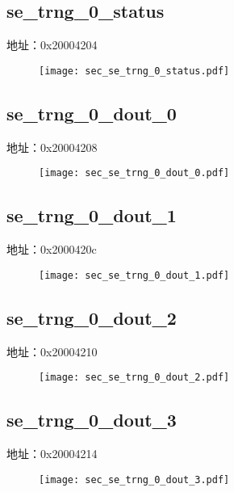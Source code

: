 \subsection{se\_trng\_0\_status}
\label{sec-se-trng-0-status}
地址：0x20004204
 \begin{figure}[H]
\texttt{[image: sec\_se\_trng\_0\_status.pdf]}
\end{figure}

\subsection{se\_trng\_0\_dout\_0}
\label{sec-se-trng-0-dout-0}
地址：0x20004208
 \begin{figure}[H]
\texttt{[image: sec\_se\_trng\_0\_dout\_0.pdf]}
\end{figure}

\subsection{se\_trng\_0\_dout\_1}
\label{sec-se-trng-0-dout-1}
地址：0x2000420c
 \begin{figure}[H]
\texttt{[image: sec\_se\_trng\_0\_dout\_1.pdf]}
\end{figure}

\subsection{se\_trng\_0\_dout\_2}
\label{sec-se-trng-0-dout-2}
地址：0x20004210
 \begin{figure}[H]
\texttt{[image: sec\_se\_trng\_0\_dout\_2.pdf]}
\end{figure}

\subsection{se\_trng\_0\_dout\_3}
\label{sec-se-trng-0-dout-3}
地址：0x20004214
 \begin{figure}[H]
\texttt{[image: sec\_se\_trng\_0\_dout\_3.pdf]}
\end{figure}


